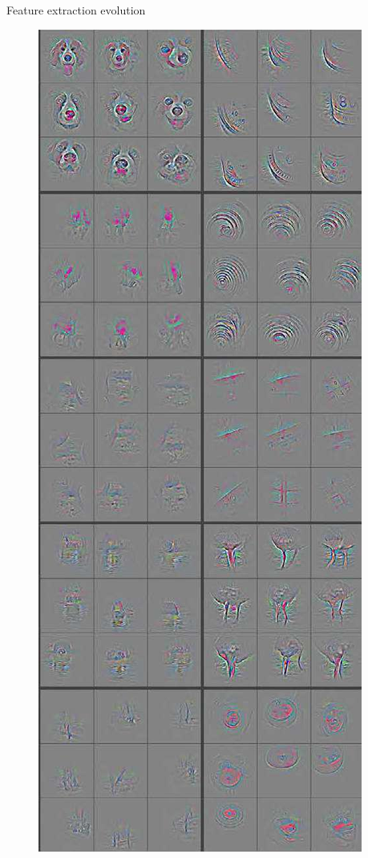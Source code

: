 \documentclass[aspectratio=169]{../latex_main/tntbeamer}
\begin{document}
\begin{frame}{Feature extraction evolution}
\begin{figure}[h]
         \hfill
         \includegraphics[scale=.4]{img249}
    \end{figure}
\end{frame}
	
	
	
	
	
	
	
	
	
\end{document}

